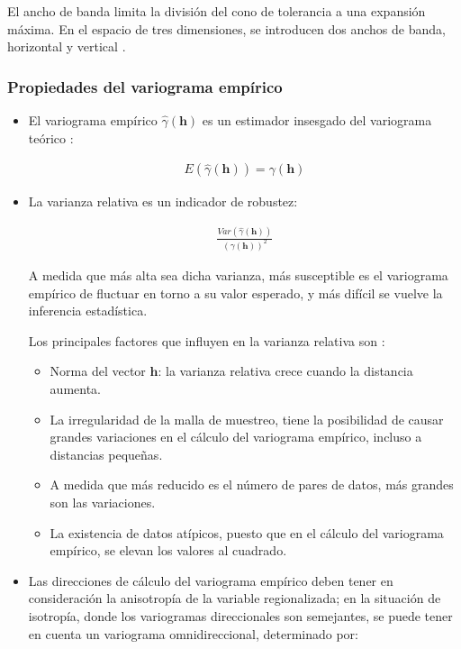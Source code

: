 \documentclass[
]{book}
\providecommand{\tightlist}{%
  \setlength{\itemsep}{0pt}\setlength{\parskip}{0pt}}
\begin{document}
El ancho de banda limita la división del cono de tolerancia a una expansión máxima. En el espacio de tres dimensiones, se introducen dos anchos de banda, horizontal y vertical \citep{emery}.

\hypertarget{propiedades-del-variograma-empuxedrico}{%
\subsubsection*{Propiedades del variograma empírico}\label{propiedades-del-variograma-empuxedrico}}

\begin{itemize}
\item
  El variograma empírico \(\hat{\gamma}(\textbf{h})\) es un estimador insesgado del variograma teórico \citep{montero}:

  \begin{align}
      E(\hat{\gamma}(\textbf{h}))=\gamma(\textbf{h})  
    \end{align}
\item
  La varianza relativa es un indicador de robustez:

  \begin{align}
      \frac{Var(\hat{\gamma}(\textbf{h}))}{(\gamma(\textbf{h}))^2}  
    \end{align}

  A medida que más alta sea dicha varianza, más susceptible es el variograma empírico de fluctuar en torno a su valor esperado, y más difícil se vuelve la inferencia estadística.

  Los principales factores que influyen en la varianza relativa son \citep{emery}:

  \begin{itemize}
  \tightlist
  \item
    Norma del vector \(\textbf{h}\): la varianza relativa crece cuando la distancia aumenta.
  \item
    La irregularidad de la malla de muestreo, tiene la posibilidad de causar grandes variaciones en el cálculo del variograma empírico, incluso a distancias pequeñas.
  \item
    A medida que más reducido es el número de pares de datos, más grandes son las variaciones.
  \item
    La existencia de datos atípicos, puesto que en el cálculo del variograma empírico, se elevan los valores al cuadrado.
  \end{itemize}
\item
  Las direcciones de cálculo del variograma empírico deben tener en consideración la anisotropía de la variable regionalizada; en la situación de isotropía, donde los variogramas direccionales son semejantes, se puede tener en cuenta un variograma omnidireccional, determinado por:


\end{itemize}
\end{document}
